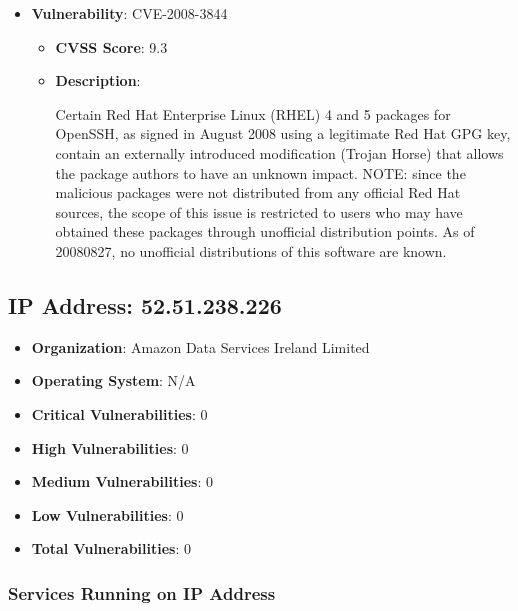 \documentclass{article}
\begin{document}
\begin{itemize}
        \item \textbf{Vulnerability}: CVE-2008-3844
        \begin{itemize}
            \item \textbf{CVSS Score}:  9.3 
            \item \textbf{Description}:
            \parbox[t]{0.9\linewidth}{
                \ttfamily Certain Red Hat Enterprise Linux (RHEL) 4 and 5 packages for OpenSSH, as signed in August 2008 using a legitimate Red Hat GPG key, contain an externally introduced modification (Trojan Horse) that allows the package authors to have an unknown impact.  NOTE: since the malicious packages were not distributed from any official Red Hat sources, the scope of this issue is restricted to users who may have obtained these packages through unofficial distribution points.  As of 20080827, no unofficial distributions of this software are known.
            }
        \end{itemize}
    
\end{itemize}




\clearpage



\subsection{IP Address: 52.51.238.226}

\begin{itemize}
    \item \textbf{Organization}: Amazon Data Services Ireland Limited
    \item \textbf{Operating System}:  N/A 
    \item \textbf{Critical Vulnerabilities}: 0
    \item \textbf{High Vulnerabilities}: 0
    \item \textbf{Medium Vulnerabilities}: 0
    \item \textbf{Low Vulnerabilities}: 0
    \item \textbf{Total Vulnerabilities}: 0
\end{itemize}

\subsubsection*{Services Running on IP Address}
\end{document}
